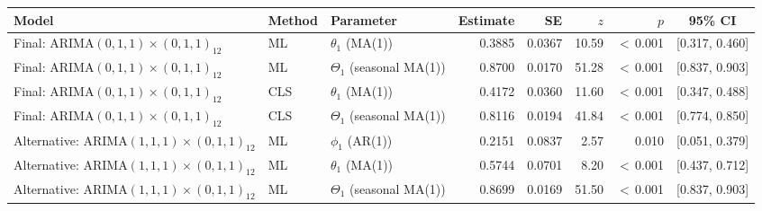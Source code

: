 \begin{tabular}{lllrrrrc}
\toprule
Model & Method & Parameter & Estimate & SE & $z$ & $p$ & 95\% CI\\
\midrule
Final: ARIMA$(0,1,1)\times(0,1,1)_{12}$ & ML & $\theta_1$ (MA(1)) & 0.3885 & 0.0367 & 10.59 & $<$\,0.001 & {}[0.317, 0.460]\\
Final: ARIMA$(0,1,1)\times(0,1,1)_{12}$ & ML & $\Theta_1$ (seasonal MA(1)) & 0.8700 & 0.0170 & 51.28 & $<$\,0.001 & {}[0.837, 0.903]\\
Final: ARIMA$(0,1,1)\times(0,1,1)_{12}$ & CLS & $\theta_1$ (MA(1)) & 0.4172 & 0.0360 & 11.60 & $<$\,0.001 & {}[0.347, 0.488]\\
Final: ARIMA$(0,1,1)\times(0,1,1)_{12}$ & CLS & $\Theta_1$ (seasonal MA(1)) & 0.8116 & 0.0194 & 41.84 & $<$\,0.001 & {}[0.774, 0.850]\\
Alternative: ARIMA$(1,1,1)\times(0,1,1)_{12}$ & ML & $\phi_1$ (AR(1)) & 0.2151 & 0.0837 & 2.57 & 0.010 & {}[0.051, 0.379]\\
Alternative: ARIMA$(1,1,1)\times(0,1,1)_{12}$ & ML & $\theta_1$ (MA(1)) & 0.5744 & 0.0701 & 8.20 & $<$\,0.001 & {}[0.437, 0.712]\\
Alternative: ARIMA$(1,1,1)\times(0,1,1)_{12}$ & ML & $\Theta_1$ (seasonal MA(1)) & 0.8699 & 0.0169 & 51.50 & $<$\,0.001 & {}[0.837, 0.903]\\
\bottomrule
\end{tabular}
